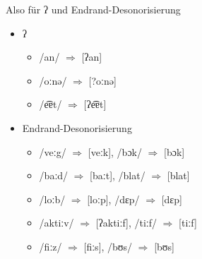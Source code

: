 \begin{frame}
  {Also für ʔ und Endrand-Desonorisierung}
  \pause
  \begin{itemize}[<+->]
    \item ʔ
      \begin{itemize}[<+->]
        \item /an/ $\Rightarrow$ [ʔan] 
        \item /oːnə/ $\Rightarrow$ [?oːnə]
        \item /e͡ɐt/ $\Rightarrow$ [ʔe͡ɐt]
      \end{itemize}
      \Zeile
    \item Endrand-Desonorisierung
      \begin{itemize}[<+->]
        \item /veːg/ $\Rightarrow$ [veːk], /bɔk/ $\Rightarrow$ [bɔk]
        \item /baːd/ $\Rightarrow$ [baːt], /blat/ $\Rightarrow$ [blat]
        \item /loːb/ $\Rightarrow$ [loːp], /dɛp/ $\Rightarrow$ [dɛp]
        \item /aktiːv/ $\Rightarrow$ [ʔaktiːf], /tiːf/ $\Rightarrow$ [tiːf]
        \item /fiːz/ $\Rightarrow$ [fiːs], /bʊs/ $\Rightarrow$ [bʊs]
      \end{itemize}
  \end{itemize}
\end{frame}


